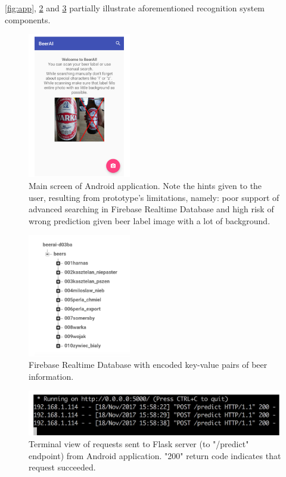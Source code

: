 \documentclass[11pt]{article}
\begin{document}
\autoref{fig:app}, \ref{fig:firebase_data} and \ref{fig:terminal_server} partially illustrate aforementioned recognition system components.

\begin{figure}[h]
\includegraphics[width=0.4\textwidth]{app}
\centering
\caption{Main screen of Android application. Note the hints given to the user, resulting from prototype's limitations, namely: poor support of advanced searching in Firebase Realtime Database and high risk of wrong prediction given beer label image with a lot of background.}
\label{fig:app}
\end{figure}

\begin{figure}[h]
\includegraphics[width=0.4\textwidth]{firebase_data}
\centering
\caption{Firebase Realtime Database with encoded key-value pairs of beer information.}
\label{fig:firebase_data}
\end{figure}

\begin{figure}[h]
\includegraphics[width=\textwidth]{terminal_server}
\centering
\caption{Terminal view of requests sent to Flask server (to "/predict" endpoint) from Android application. "200" return code indicates that request succeeded.}
\label{fig:terminal_server}
\end{figure}
\end{document}
